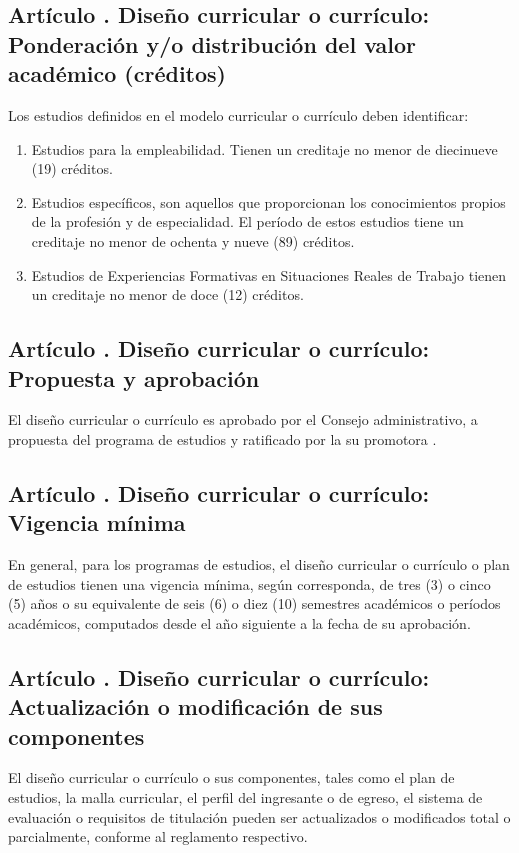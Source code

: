 \subsection{Artículo . Diseño curricular o currículo: Ponderación y/o distribución del valor académico (créditos)}
\addtocounter{ns}{1}
Los estudios definidos en el modelo curricular o currículo deben identificar: 
\begin{enumerate}
\item Estudios para la empleabilidad. Tienen un creditaje no menor de diecinueve (19) créditos.  
\item Estudios específicos, son aquellos que proporcionan los conocimientos propios de la profesión y de especialidad. El período de estos estudios tiene un creditaje no menor de ochenta y nueve (89) créditos. 
\item Estudios de Experiencias Formativas en Situaciones Reales de Trabajo tienen un creditaje no menor de doce (12) créditos.
\end{enumerate}
\subsection{Artículo . Diseño curricular o currículo: Propuesta y aprobación}
\addtocounter{ns}{1}
El diseño curricular o currículo es aprobado por el Consejo administrativo, a propuesta del programa de estudios y ratificado por la su promotora .  
\subsection{Artículo . Diseño curricular o currículo: Vigencia mínima}
\addtocounter{ns}{1}
En general, para los programas de estudios, el diseño curricular o currículo o plan de estudios tienen una vigencia mínima, según corresponda, de tres (3) o cinco (5) años o su equivalente de seis (6) o diez (10) semestres académicos o períodos académicos, computados desde el año siguiente a la fecha de su aprobación. 
\subsection{Artículo . Diseño curricular o currículo: Actualización o modificación de sus componentes}
\addtocounter{ns}{1}
El diseño curricular o currículo o sus componentes, tales como el plan de estudios, la malla curricular, el perfil del ingresante o de egreso, el sistema de evaluación o requisitos de titulación pueden ser actualizados o modificados total o parcialmente, conforme al reglamento respectivo. 
